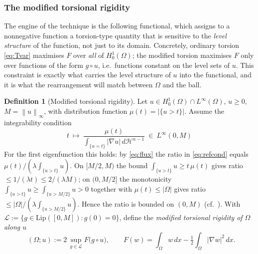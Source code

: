 \documentclass[11pt]{amsart}
\theoremstyle{definition}
\newtheorem{definition}[theorem]{Definition}
\newcommand{\Om}{\Omega}
\newcommand{\abs}[1]{\left|#1\right|}
\newcommand{\norm}[1]{\left\|#1\right\|}
\newcommand{\dx}{\,dx}
\newcommand{\dH}{\,d\mathcal H^{n-1}}
\DeclareMathOperator{\Tmod}{T_{\mathrm{mod}}}
\begin{document}
\subsubsection*{The modified torsional rigidity}

The engine of the technique is the following functional, which assigns to a
nonnegative function a torsion-type quantity that is sensitive to the
\emph{level structure} of the function, not just to its domain. Concretely,
ordinary torsion \eqref{eq:Tvar} maximises $F$ over \emph{all} of
$H^1_0(\Om)$; the modified torsion maximises $F$ only over functions of the
form $g\circ u$, i.e.\ functions constant on the level sets of $u$. This
constraint is exactly what carries the level structure of $u$ into the
functional, and it is what the rearrangement will match between $\Om$ and
the ball.

\begin{definition}[Modified torsional rigidity]\label{def:tmod}
Let $u\in H^1_0(\Om)\cap L^\infty(\Om)$, $u\ge0$, $M=\norm u_\infty$, with
distribution function $\mu(t)=\abs{\{u>t\}}$. Assume the integrability
condition
\begin{equation}\label{eq:refcond}
  t\ \longmapsto\ \frac{\mu(t)}{\int_{\{u=t\}}\abs{\nabla u}\dH}\ \in\ L^\infty(0,M)
\end{equation}
For the first eigenfunction this holds: by \eqref{eq:flux} the ratio in
\eqref{eq:refcond} equals $\mu(t)/(\lambda\int_{\{u>t\}}u)$. On $[M/2,M)$ the
bound $\int_{\{u>t\}}u\ge t\,\mu(t)$ gives ratio $\le 1/(\lambda t)\le
2/(\lambda M)$; on $(0,M/2]$ the monotonicity $\int_{\{u>t\}}u\ge
\int_{\{u>M/2\}}u>0$ together with $\mu(t)\le\abs\Om$ gives ratio $\le
\abs\Om/(\lambda\int_{\{u>M/2\}}u)$. Hence the ratio is bounded on $(0,M)$
(cf.~\cite[Lem.~3.2]{Brasco2014}). With
$\mathcal L:=\{g\in\mathrm{Lip}([0,M]):g(0)=0\}$, define the
\emph{modified torsional rigidity of $\Om$ along $u$}
\begin{equation}\label{eq:tmod-def}
  \Tmod(\Om;u):=2\,\sup_{g\in\mathcal L}F\bigl(g\circ u\bigr),
  \qquad F(w)=\int_\Om w\dx-\tfrac12\int_\Om\abs{\nabla w}^2\dx .
\end{equation}
\end{definition}
\end{document}
